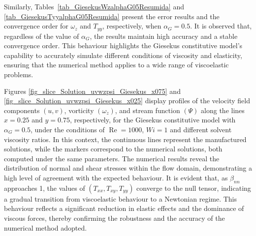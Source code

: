 \documentclass[preprint, 12pt]{elsarticle}
\begin{document}
Similarly, Tables~\ref{tab_GiesekusWzalphaG05Resumida} and
\ref{tab_GiesekusTyyalphaG05Resumida} present the error results and the
convergence order for $\omega_{z}$ and $T_{yy}$, respectively, when $\alpha_G =
0.5$. It is observed that, regardless of the value of $\alpha_G$, the results
maintain high accuracy and a stable convergence order. This behaviour
highlights the Giesekus {\color{red} constitutive model's capability to accurately simulate
different conditions of viscosity and elasticity, ensuring that the numerical
method applies to a wide range of viscoelastic problems.}

Figures \ref{fig_slice_Solution_uvwzpsi_Giesekus_x075} and
\ref{fig_slice_Solution_uvwzpsi_Giesekus_x025} display profiles of the velocity
field components $(u, v)$, vorticity $(\omega_z)$, and stream function $(\Psi)$
along the lines $x=0.25$ and $y=0.75$, respectively, for the Giesekus
constitutive model with $\alpha_G = 0.5$, under the conditions of
$\operatorname{Re}=1000$, $Wi=1$ and different solvent viscosity ratios. In
this context, the continuous lines represent the manufactured solutions, while
the markers correspond to the numerical solutions, both computed under the same
parameters. The numerical results reveal the distribution of normal and shear
stresses within the flow domain, demonstrating a high level of agreement with
the expected behaviour. It is evident that, as $\beta_{nn}$ approaches 1, the
values of $(T_{xx}, T_{xy}, T_{yy})$ converge to the null tensor, indicating a
gradual transition from viscoelastic behaviour to a Newtonian regime. This
behaviour reflects a significant reduction in elastic effects and the dominance
of viscous forces, thereby confirming the robustness and the accuracy of the
numerical method adopted.
\end{document}
